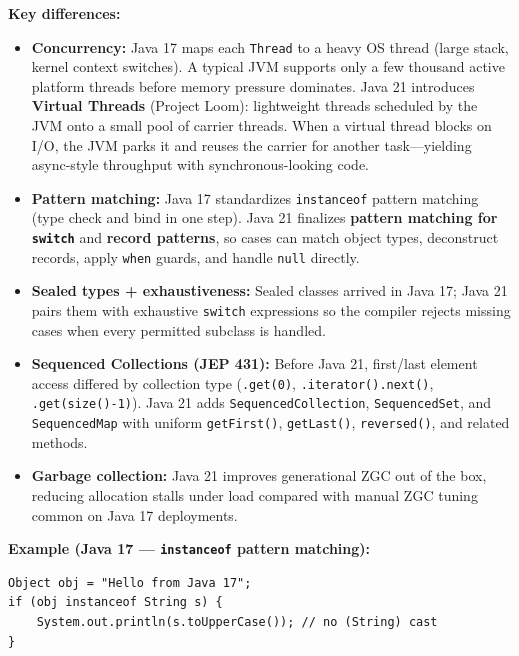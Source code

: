 \begin{solutionorbox}[5.5in]
\textbf{Key differences:}
\begin{itemize}
  \item \textbf{Concurrency:} Java 17 maps each \lstinline[style=javainline]|Thread| to a heavy OS thread (large stack, kernel context switches). A typical JVM supports only a few thousand active platform threads before memory pressure dominates. Java 21 introduces \textbf{Virtual Threads} (Project Loom): lightweight threads scheduled by the JVM onto a small pool of carrier threads. When a virtual thread blocks on I/O, the JVM parks it and reuses the carrier for another task---yielding async-style throughput with synchronous-looking code.
  \item \textbf{Pattern matching:} Java 17 standardizes \lstinline[style=javainline]|instanceof| pattern matching (type check and bind in one step). Java 21 finalizes \textbf{pattern matching for \lstinline[style=javainline]|switch|} and \textbf{record patterns}, so cases can match object types, deconstruct records, apply \lstinline[style=javainline]|when| guards, and handle \lstinline[style=javainline]|null| directly.
  \item \textbf{Sealed types + exhaustiveness:} Sealed classes arrived in Java 17; Java 21 pairs them with exhaustive \lstinline[style=javainline]|switch| expressions so the compiler rejects missing cases when every permitted subclass is handled.
  \item \textbf{Sequenced Collections (JEP 431):} Before Java 21, first/last element access differed by collection type (\lstinline[style=javainline]|.get(0)|, \lstinline[style=javainline]|.iterator().next()|, \lstinline[style=javainline]|.get(size()-1)|). Java 21 adds \lstinline[style=javainline]|SequencedCollection|, \lstinline[style=javainline]|SequencedSet|, and \lstinline[style=javainline]|SequencedMap| with uniform \lstinline[style=javainline]|getFirst()|, \lstinline[style=javainline]|getLast()|, \lstinline[style=javainline]|reversed()|, and related methods.
  \item \textbf{Garbage collection:} Java 21 improves generational ZGC out of the box, reducing allocation stalls under load compared with manual ZGC tuning common on Java 17 deployments.
\end{itemize}

\textbf{Example (Java 17 --- \lstinline[style=javainline]|instanceof| pattern matching):}
\begin{lstlisting}[style=java]
Object obj = "Hello from Java 17";
if (obj instanceof String s) {
    System.out.println(s.toUpperCase()); // no (String) cast
}
\end{lstlisting}


\end{solutionorbox}
